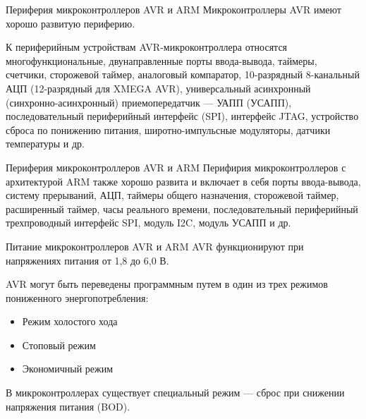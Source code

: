 \documentclass[12pt,a4paper,mathserif]{beamer}
\begin{document}
\begin{frame}{Периферия микроконтроллеров AVR и ARM}
    \setlength{\parindent}{0.5cm}
    Микроконтроллеры AVR имеют хорошо развитую периферию.
    
    К периферийным устройствам AVR-микроконтроллера относятся многофункциональные, двунаправленные порты ввода-вывода, таймеры, счетчики, сторожевой таймер, аналоговый компаратор, 10-разрядный 8-канальный АЦП (12-разрядный для XMEGA AVR), универсальный асинхронный (синхронно-асинхронный) приемопередатчик --- УАПП (УСАПП), последовательный периферийный интерфейс (SPI), интерфейс JTAG, устройство сброса по понижению питания, широтно-импульсные модуляторы, датчики температуры и др.
\end{frame}

\begin{frame}{Периферия микроконтроллеров AVR и ARM}
    \setlength{\parindent}{0.5cm}
    Перифирия микроконтроллеров с архитектурой ARM также хорошо развита и включает в себя порты ввода-вывода, систему прерываний, АЦП, таймеры общего назначения, сторожевой таймер, расширенный таймер, часы реального времени, последовательный периферийный трехпроводный интерфейс SPI, модуль I2C, модуль УСАПП и др.
\end{frame}

\begin{frame}{Питание  микроконтроллеров AVR и ARM}
    \setlength{\parindent}{0.5cm}
    AVR функционируют при напряжениях питания от 1,8 до 6,0 В.

    AVR могут быть переведены программным путем в один из трех режимов пониженного энергопотребления:
    
    \begin{itemize}
        \item Режим холостого хода
    
        \item Стоповый режим
    
        \item Экономичный режим
    \end{itemize}
    
    В микроконтроллерах существует специальный режим --- сброс при снижении напряжения питания (BOD).
\end{frame}
\end{document}

